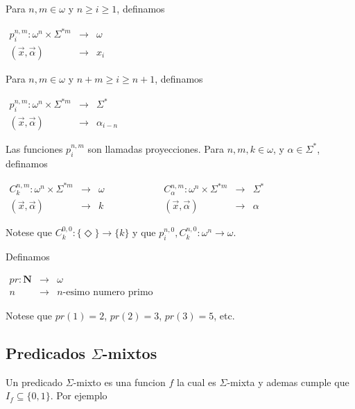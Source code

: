 Para \(n,m\in \omega \) y \(n\geq i\geq 1\), definamos

\(\displaystyle \begin{array}{rll} p_{i}^{n,m}:\omega ^{n}\times \Sigma ^{\ast m} & \rightarrow & \omega \\ (\vec{x},\vec{\alpha}) & \rightarrow & x_{i} \end{array} \)

Para \(n,m\in \omega \) y \(n+m\geq i\geq n+1\), definamos

\(\displaystyle \begin{array}{rll} p_{i}^{n,m}:\omega ^{n}\times \Sigma ^{\ast m} & \rightarrow & \Sigma ^{\ast } \\ (\vec{x},\vec{\alpha}) & \rightarrow & \alpha _{i-n} \end{array} \)

Las funciones \(p_{i}^{n,m}\) son llamadas proyecciones. Para \( n,m,k\in \omega \), y \(\alpha \in \Sigma ^{\ast }\), definamos


\(\displaystyle \begin{array}{rll} C_{k}^{n,m}:\omega ^{n}\times \Sigma ^{\ast m} & \rightarrow & \omega \\ (\vec{x},\vec{\alpha}) & \rightarrow & k \end{array} \ \ \ \ \ \ \ \ \ \ \ \ \ \ \ \ \ \ \ \ \ \ \ \ \begin{array}{rll} C_{\alpha }^{n,m}:\omega ^{n}\times \Sigma ^{\ast m} & \rightarrow & \Sigma ^{\ast } \\ (\vec{x},\vec{\alpha}) & \rightarrow & \alpha \end{array} \)

Notese que \(C_{k}^{0,0}:\{\Diamond \}\rightarrow \{k\}\) y que \( p_{i}^{n,0},C_{k}^{n,0}:\omega ^{n}\rightarrow \omega \).
\par Definamos


\(\displaystyle \begin{array}{rll} pr:\mathbf{N} & \rightarrow & \omega \\ n & \rightarrow & n\text{-esimo numero primo} \end{array} \)

Notese que \(pr(1)=2\), \(pr(2)=3\), \(pr(3)=5\), etc.

\subsection{Predicados \(\Sigma \)-mixtos}

Un predicado \(\Sigma \)-mixto es una funcion \(f\) la cual es \(\Sigma \)-mixta y ademas cumple que \(I_{f}\subseteq \{0,1\}\). Por ejemplo

